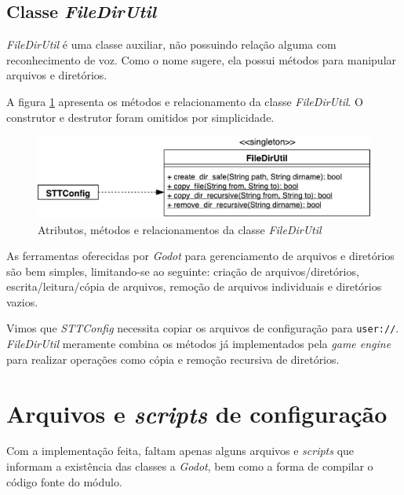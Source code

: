 
\subsection{Classe \textit{FileDirUtil}}

\textit{FileDirUtil} é uma classe auxiliar, não possuindo relação alguma com reconhecimento de voz. Como o nome sugere, ela possui métodos para manipular arquivos e diretórios.

A figura \ref{file-dir-util-diagram} apresenta os métodos e relacionamento da classe \textit{FileDirUtil}. O construtor e destrutor foram omitidos por simplicidade.

\begin{figure}[H]
  \centering
  \includegraphics[width=.75\textwidth]{image/file-dir-util.pdf}
  \caption{Atributos, métodos e relacionamentos da classe \textit{FileDirUtil}}
  \label{file-dir-util-diagram}
\end{figure}

As ferramentas oferecidas por \textit{Godot} para gerenciamento de arquivos e diretórios são bem simples, limitando-se ao seguinte: criação de arquivos/diretórios, escrita/leitura/cópia de arquivos, remoção de arquivos individuais e diretórios vazios.

Vimos que \textit{STTConfig} necessita copiar os arquivos de configuração para \texttt{user://}. \textit{FileDirUtil} meramente combina os métodos já implementados pela \textit{game engine} para realizar operações como cópia e remoção recursiva de diretórios.


\section{Arquivos e \textit{scripts} de configuração}

Com a implementação feita, faltam apenas alguns arquivos e \textit{scripts} que informam a existência das classes a \textit{Godot}, bem como a forma de compilar o código fonte do módulo.

